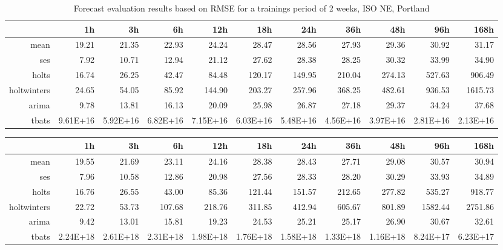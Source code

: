 \begin{landscape}
\begin{table}[ht]
\centering
\vspace*{-0.2in}
\begin{tabular}{rrrrrrrrrrr}
  \hline
 & 1h & 3h & 6h & 12h & 18h & 24h & 36h & 48h & 96h & 168h \\ 
  \hline
mean & 19.21 & 21.35 & 22.93 & 24.24 & 28.47 & 28.56 & 27.93 & 29.36 & 30.92 & 31.17 \\ 
  ses & 7.92 & 10.71 & 12.94 & 21.12 & 27.62 & 28.38 & 28.25 & 30.32 & 33.99 & 34.90 \\ 
  holts & 16.74 & 26.25 & 42.47 & 84.48 & 120.17 & 149.95 & 210.04 & 274.13 & 527.63 & 906.49 \\ 
  holtwinters & 24.65 & 54.05 & 85.92 & 144.90 & 203.27 & 257.96 & 368.25 & 482.61 & 936.53 & 1615.73 \\ 
  arima & 9.78 & 13.81 & 16.13 & 20.09 & 25.98 & 26.87 & 27.18 & 29.37 & 34.24 & 37.68 \\ 
  tbats & 9.61E+16 & 5.92E+16 & 6.82E+16 & 7.15E+16 & 6.03E+16 & 5.48E+16 & 4.56E+16 & 3.97E+16 & 2.81E+16 & 2.13E+16 \\ 
   \hline
\end{tabular}
\caption{Forecast evaluation results based on RMSE for a trainings period of 2 weeks, ISO NE, Portland}
\label{tab:app_results_portland_2weeks}
\end{table}
\begin{table}[ht]
\centering
\vspace*{-0.1in}
\begin{tabular}{rrrrrrrrrrr}
  \hline
 & 1h & 3h & 6h & 12h & 18h & 24h & 36h & 48h & 96h & 168h \\ 
  \hline
mean & 19.55 & 21.69 & 23.11 & 24.16 & 28.38 & 28.43 & 27.71 & 29.08 & 30.57 & 30.94 \\ 
  ses & 7.96 & 10.58 & 12.86 & 20.98 & 27.56 & 28.33 & 28.20 & 30.29 & 33.93 & 34.89 \\ 
  holts & 16.76 & 26.55 & 43.00 & 85.36 & 121.44 & 151.57 & 212.65 & 277.82 & 535.27 & 918.77 \\ 
  holtwinters & 22.72 & 53.73 & 107.68 & 218.76 & 311.85 & 412.94 & 605.67 & 801.89 & 1582.44 & 2751.86 \\ 
  arima & 9.42 & 13.01 & 15.81 & 19.23 & 24.53 & 25.21 & 25.17 & 26.90 & 30.67 & 32.61 \\ 
  tbats & 2.24E+18 & 2.61E+18 & 2.31E+18 & 1.98E+18 & 1.76E+18 & 1.58E+18 & 1.33E+18 & 1.16E+18 & 8.24E+17 & 6.23E+17 \\ 

\end{tabular}
\end{table}
\end{landscape}
